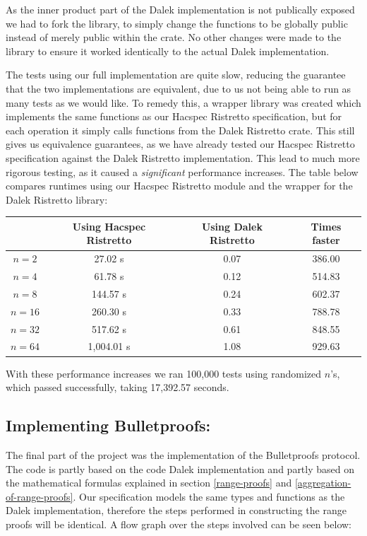 \documentclass{article}
\begin{document}
As the inner product part of the Dalek implementation is not publically
exposed we had to fork the library, to simply change the functions to be
globally public instead of merely public within the crate. No other
changes were made to the library to ensure it worked identically to
the actual Dalek implementation.

The tests using our full implementation are quite slow, reducing the 
guarantee that the two implementations are equivalent, due to us not 
being able to run as many tests as we would like. To remedy this, 
a wrapper library was created which implements the same functions as 
our Hacspec Ristretto specification, but for each operation it simply 
calls functions from the Dalek Ristretto crate. This still gives us 
equivalence guarantees, as we have already tested our Hacspec Ristretto 
specification against the Dalek Ristretto implementation. This lead to 
much more rigorous testing, as it caused a \textit{significant} 
performance increases. The table below compares runtimes using our 
Hacspec Ristretto module and the wrapper for the Dalek Ristretto library:

\begin{center}
\begin{tabular}{ c|c|c|c } 
          & Using Hacspec Ristretto & Using Dalek Ristretto & Times faster \\ \hline\hline
 $n = 2$  & 27.02 s    & 0.07 & 386.00 \\ \hline
 $n = 4$  & 61.78 s    & 0.12 & 514.83 \\ \hline
 $n = 8$  & 144.57 s   & 0.24 & 602.37 \\ \hline
 $n = 16$ & 260.30 s   & 0.33 & 788.78 \\ \hline
 $n = 32$ & 517.62 s   & 0.61 & 848.55 \\ \hline
 $n = 64$ & 1,004.01 s & 1.08 & 929.63 \\ \hline
\end{tabular}
\end{center}

With these performance increases we ran 100,000 tests using
randomized $n$'s, which passed successfully, taking 17,392.57 seconds.

\subsection{Implementing Bulletproofs:} \label{implementing-bulletproofs}

The final part of the project was the implementation of the
Bulletproofs protocol. The code is partly based on the code Dalek
implementation and partly based on the mathematical formulas explained
in section \ref{range-proofs} and \ref{aggregation-of-range-proofs}. Our
specification models the same types and functions as the Dalek
implementation, therefore the steps performed in constructing the range
proofs will be identical. A flow graph over the steps involved
can be seen below:
\end{document}
